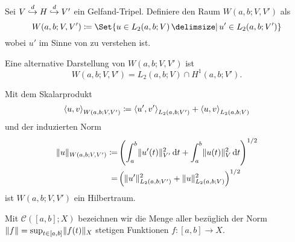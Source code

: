 \begin{Definition}
\label{definition:gl:bochner_raum_W}
    Sei $V \stackrel{d}{\hookrightarrow} H \stackrel{d}{\hookrightarrow} V'$ ein Gelfand-Tripel.
    Definiere den Raum $W(a, b; V, V')$ als
    \begin{equation}
        W(a, b; V, V') \deq \Set{u \in L_{2}(a, b; V) \given u' \in L_{2}(a, b; V')}
    \end{equation}
    wobei $u'$ im Sinne von  zu verstehen ist.
\end{Definition}

\begin{Bemerkung}
\label{bemerkung:gl:alternative_darstellung_bochner}
    Eine alternative Darstellung von $W(a, b; V, V')$ ist
    \begin{equation}
        W(a, b; V, V') = L_{2}(a, b; V) \cap H^{1}(a, b; V').
    \end{equation}
\end{Bemerkung}

\begin{Lemma}
\label{lemma:gl:w_a_v_v_ist_hilbertraum}
    Mit dem Skalarprodukt
    \begin{equation}
        \left\langle u,v\right\rangle_{W(a, b; V, V')} \coloneqq \left\langle u',v'\right\rangle_{L_{2}(a, b; V')} +  \left\langle u,v\right\rangle_{L_{2}(a, b; V)}
    \end{equation}
    und der induzierten Norm
    \begin{equation}
        \begin{aligned}
            \lVert u\rVert_{W(a, b; V, V')}
            \coloneqq& \left( \int_{a}^{b} \lVert u'(t)\rVert_{V'}^{2} \mathop{}\!\mathrm{d} t + \int_{a}^{b} \lVert u(t)\rVert_{V}^{2} \mathop{}\!\mathrm{d} t \right)^{1/2}
            \\=& \left( \lVert u'\rVert_{L_{2}(a, b; V')}^{2} + \lVert u\rVert_{L_{2}(a, b; V)}^{2} \right)^{1/2}
        \end{aligned}
    \end{equation}
    ist $W(a, b; V, V')$ ein Hilbertraum.
\end{Lemma}

\begin{Definition}
\label{definition:gl:stetige_funktionen}
    Mit $\mathcal C([a, b]; X)$ bezeichnen wir die Menge aller bezüglich der Norm $\lVert f\rVert = \sup_{t \in [a, b]} \lVert f(t)\rVert_{X}$ stetigen Funktionen $f \colon [a, b] \to X$.
\end{Definition}


